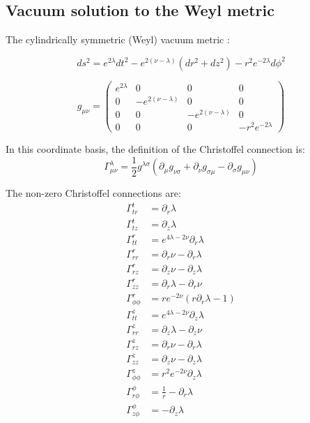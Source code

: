 \documentclass[12pt]{article}
\begin{document}
\begin{appendices}
\section{Vacuum solution to the Weyl metric}

The cylindrically symmetric (Weyl) vacuum metric \cite{synge_relativity}:

\begin{equation}
  ds^{2}=e^{2\lambda}dt^{2}-e^{2\left(\nu-\lambda\right)}\left(dr^{2}+dz^{2}\right)-r^{2}e^{-2\lambda}d\phi^{2}
\end{equation}

\begin{equation}
g_{\mu\nu}=\left(\begin{array}{cccc}
e^{2\lambda} & 0 & 0 & 0\\
0 & -e^{2\left(\nu-\lambda\right)} & 0 & 0\\
0 & 0 & -e^{2\left(\nu-\lambda\right)} & 0\\
0 & 0 & 0 & -r^{2}e^{-2\lambda}
\end{array}\right)\label{eq:general-axisymmetric-static-matrix-metric}
\end{equation}

In this coordinate basis, the definition of the Christoffel connection is: \cite{carroll_spacetime_2003} 
\begin{equation}
\Gamma_{\mu\nu}^{\lambda}=\frac{1}{2}g^{\lambda\sigma}\left(\partial_{\mu}g_{\nu\sigma}+\partial_{\nu}g_{\sigma\mu}-\partial_{\sigma}g_{\mu\nu}\right)
\end{equation}

The non-zero Christoffel connections are:
\begin{equation}
\begin{aligned}
\Gamma^{t}_{tr}&=\partial_{r}\lambda\\
\Gamma^{t}_{tz}&=\partial_{z}\lambda\\
\Gamma^{r}_{tt}&=e^{4\lambda-2\nu}\partial_{r}\lambda\\
\Gamma^{r}_{rr}&=\partial_{r}\nu-\partial_{r}\lambda\\
\Gamma^{r}_{rz}&=\partial_{z}\nu-\partial_{z}\lambda\\
\Gamma^{r}_{zz}&=\partial_{r}\lambda-\partial_{r}\nu\\
\Gamma^{r}_{\phi\phi}&=re^{-2\nu}\left(r\partial_{r}\lambda-1\right)\\
\Gamma^{z}_{tt}&=e^{4\lambda-2\nu}\partial_{z}\lambda\\
\Gamma^{z}_{rr}&=\partial_{z}\lambda-\partial_{z}\nu\\
\Gamma^{z}_{rz}&=\partial_{r}\nu-\partial_{r}\lambda\\ 
\Gamma^{z}_{zz}&=\partial_{z}\nu-\partial_{z}\lambda\\
\Gamma^{z}_{\phi\phi}&=r^{2}e^{-2\nu}\partial_{z}\lambda\\
\Gamma^{\phi}_{r\phi}&=\frac{1}{r}-\partial_{r}\lambda\\
\Gamma^{\phi}_{z\phi}&=-\partial_{z}\lambda\\
\end{aligned}
\label{eq:christoffel-connections}
\end{equation}


\end{appendices}
\end{document}
